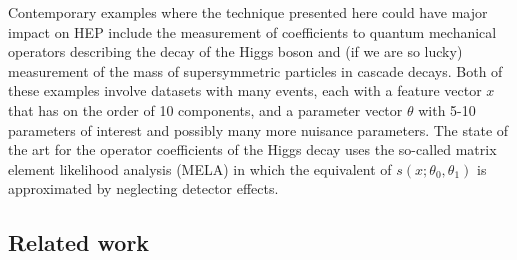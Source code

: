 \documentclass[11pt, oneside]{article}   	%
\begin{document}
Contemporary examples where the technique presented here could have major impact on HEP include the measurement of coefficients to quantum mechanical operators describing the decay of the Higgs boson and (if we are so lucky) measurement of the mass of supersymmetric particles in cascade decays.  Both of these examples involve datasets with many events, each with a feature vector $x$ that has on the order of 10 components, and a parameter vector $\theta$ with 5-10 parameters of interest and possibly many more nuisance parameters. 
The state of the art for the operator coefficients of the Higgs decay uses the so-called matrix element likelihood analysis (MELA) in which the equivalent of $s(x; \theta_0, \theta_1)$ is approximated by neglecting detector effects. 

\subsection{Related work}

\end{document}
